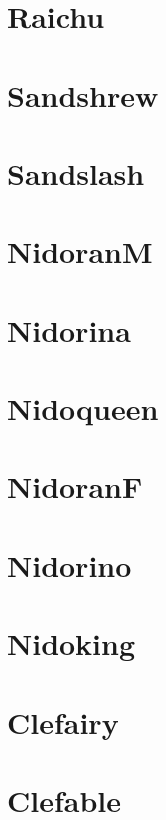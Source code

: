 \section{Raichu}
\label{exp:Raichu}
\section{Sandshrew}
\label{exp:Sandshrew}
\section{Sandslash}
\label{exp:Sandslash}
\section{NidoranM}
\label{exp:NidoranM}
\section{Nidorina}
\label{exp:Nidorina}
\section{Nidoqueen}
\label{exp:Nidoqueen}
\section{NidoranF}
\label{exp:NidoranF}
\section{Nidorino}
\label{exp:Nidorino}
\section{Nidoking}
\label{exp:Nidoking}
\section{Clefairy}
\label{exp:Clefairy}
\section{Clefable}
\label{exp:Clefable}
